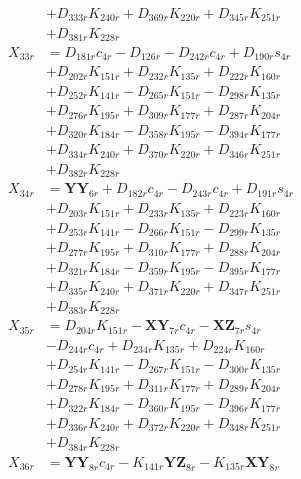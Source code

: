 \begin{multicols}{2}
\begin{align}
&+ D_{333r}K_{240r} + D_{369r}K_{220r} + D_{345r}K_{251r}  \nonumber \\
&+ D_{381r}K_{228r} \nonumber \\
X_{33r} &= D_{181r}c_{4r} - D_{126r} - D_{242r}c_{4r} + D_{190r}s_{4r}  \nonumber \\
&+ D_{202r}K_{151r} + D_{232r}K_{135r} + D_{222r}K_{160r}  \nonumber \\
&+ D_{252r}K_{141r} - D_{265r}K_{151r} - D_{298r}K_{135r}  \nonumber \\
&+ D_{276r}K_{195r} + D_{309r}K_{177r} + D_{287r}K_{204r}  \nonumber \\
&+ D_{320r}K_{184r} - D_{358r}K_{195r} - D_{394r}K_{177r}  \nonumber \\
&+ D_{334r}K_{240r} + D_{370r}K_{220r} + D_{346r}K_{251r}  \nonumber \\
&+ D_{382r}K_{228r} \nonumber \\
X_{34r} &= \mathbf{YY}_{6r} + D_{182r}c_{4r} - D_{243r}c_{4r} + D_{191r}s_{4r}  \nonumber \\
&+ D_{203r}K_{151r} + D_{233r}K_{135r} + D_{223r}K_{160r}  \nonumber \\
&+ D_{253r}K_{141r} - D_{266r}K_{151r} - D_{299r}K_{135r}  \nonumber \\
&+ D_{277r}K_{195r} + D_{310r}K_{177r} + D_{288r}K_{204r}  \nonumber \\
&+ D_{321r}K_{184r} - D_{359r}K_{195r} - D_{395r}K_{177r}  \nonumber \\
&+ D_{335r}K_{240r} + D_{371r}K_{220r} + D_{347r}K_{251r}  \nonumber \\
&+ D_{383r}K_{228r} \nonumber \\
X_{35r} &= D_{204r}K_{151r} - \mathbf{XY}_{7r}c_{4r} - \mathbf{XZ}_{7r}s_{4r}  \nonumber \\
&- D_{244r}c_{4r} + D_{234r}K_{135r} + D_{224r}K_{160r}  \nonumber \\
&+ D_{254r}K_{141r} - D_{267r}K_{151r} - D_{300r}K_{135r}  \nonumber \\
&+ D_{278r}K_{195r} + D_{311r}K_{177r} + D_{289r}K_{204r}  \nonumber \\
&+ D_{322r}K_{184r} - D_{360r}K_{195r} - D_{396r}K_{177r}  \nonumber \\
&+ D_{336r}K_{240r} + D_{372r}K_{220r} + D_{348r}K_{251r}  \nonumber \\
&+ D_{384r}K_{228r} \nonumber \\
X_{36r} &= \mathbf{YY}_{8r}c_{4r} - K_{141r}\mathbf{YZ}_{8r} - K_{135r}\mathbf{XY}_{8r}  \nonumber \\

\end{align}
\end{multicols}
